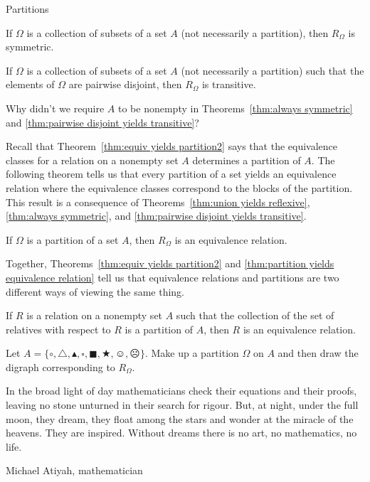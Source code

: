 \begin{section}{Partitions}
\begin{theorem}\label{thm:always symmetric}
If $\Omega$ is a collection of subsets of a set $A$ (not necessarily a partition), then $R_{\Omega}$ is symmetric.
\end{theorem}

\begin{theorem}\label{thm:pairwise disjoint yields transitive}
If $\Omega$ is a collection of subsets of a set $A$ (not necessarily a partition) such that the elements of $\Omega$ are pairwise disjoint, then $R_{\Omega}$ is transitive.
\end{theorem}

\begin{problem}
Why didn't we require $A$ to be nonempty in Theorems~\ref{thm:always symmetric} and \ref{thm:pairwise disjoint yields transitive}?
\end{problem}

Recall that Theorem~\ref{thm:equiv yields partition2} says that the equivalence classes for a relation on a nonempty set $A$ determines a partition of $A$.  The following theorem tells us that every partition of a set yields an equivalence relation where the equivalence classes correspond to the blocks of the partition. This result is a consequence of Theorems~\ref{thm:union yields reflexive}, \ref{thm:always symmetric}, and \ref{thm:pairwise disjoint yields transitive}.

\begin{theorem}\label{thm:partition yields equivalence relation}
If $\Omega$ is a partition of a set $A$, then $R_{\Omega}$ is an equivalence relation.
\end{theorem}

Together, Theorems~\ref{thm:equiv yields partition2} and \ref{thm:partition yields equivalence relation} tell us that equivalence relations and partitions are two different ways of viewing the same thing.

\begin{corollary}\label{cor:partition yields equivalence relation}
If $R$ is a relation on a nonempty set $A$ such that the collection of the set of relatives with respect to $R$ is a partition of $A$, then $R$ is an equivalence relation.
\end{corollary}

\begin{problem}
Let $A=\{\circ, \triangle, \blacktriangle, \square, \blacksquare, \bigstar, \smiley, \frownie\}$.  Make up a partition $\Omega$ on $A$ and then draw the digraph corresponding to $R_{\Omega}$. 
\end{problem}

\epigraph{In the broad light of day mathematicians check their equations and their proofs, leaving no stone unturned in their search for rigour. But, at night, under the full moon, they dream, they float among the stars and wonder at the miracle of the heavens. They are inspired. Without dreams there is no art, no mathematics, no life.}{Michael Atiyah, mathematician}

\end{section}